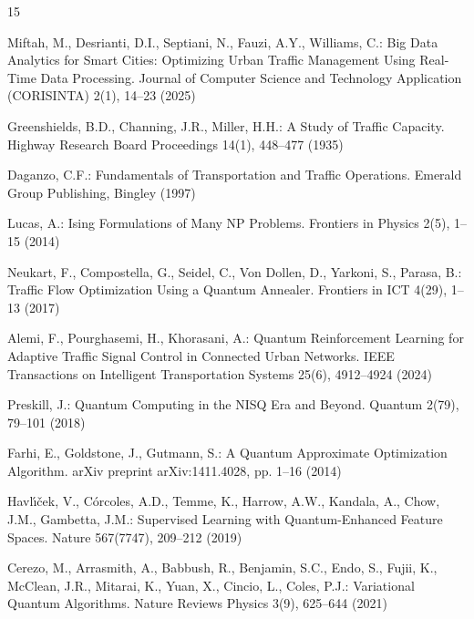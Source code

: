 \documentclass{llncs}
\begin{document}
\begin{thebibliography}{15}

Miftah, M., Desrianti, D.I., Septiani, N., Fauzi, A.Y., Williams, C.: Big Data Analytics for Smart Cities: Optimizing Urban Traffic Management Using Real-Time Data Processing. Journal of Computer Science and Technology Application (CORISINTA) 2(1), 14--23 (2025)

Greenshields, B.D., Channing, J.R., Miller, H.H.: A Study of Traffic Capacity. Highway Research Board Proceedings 14(1), 448--477 (1935)

Daganzo, C.F.: Fundamentals of Transportation and Traffic Operations. Emerald Group Publishing, Bingley (1997)

Lucas, A.: Ising Formulations of Many NP Problems. Frontiers in Physics 2(5), 1--15 (2014)

Neukart, F., Compostella, G., Seidel, C., Von Dollen, D., Yarkoni, S., Parasa, B.: Traffic Flow Optimization Using a Quantum Annealer. Frontiers in ICT 4(29), 1--13 (2017)

Alemi, F., Pourghasemi, H., Khorasani, A.: Quantum Reinforcement Learning for Adaptive Traffic Signal Control in Connected Urban Networks. IEEE Transactions on Intelligent Transportation Systems 25(6), 4912--4924 (2024)

Preskill, J.: Quantum Computing in the NISQ Era and Beyond. Quantum 2(79), 79--101 (2018)

Farhi, E., Goldstone, J., Gutmann, S.: A Quantum Approximate Optimization Algorithm. arXiv preprint arXiv:1411.4028, pp. 1--16 (2014)

Havl{\'\i}{\v{c}}ek, V., C{\'o}rcoles, A.D., Temme, K., Harrow, A.W., Kandala, A., Chow, J.M., Gambetta, J.M.: Supervised Learning with Quantum-Enhanced Feature Spaces. Nature 567(7747), 209--212 (2019)

Cerezo, M., Arrasmith, A., Babbush, R., Benjamin, S.C., Endo, S., Fujii, K., McClean, J.R., Mitarai, K., Yuan, X., Cincio, L., Coles, P.J.: Variational Quantum Algorithms. Nature Reviews Physics 3(9), 625--644 (2021)


\end{thebibliography}
\end{document}
